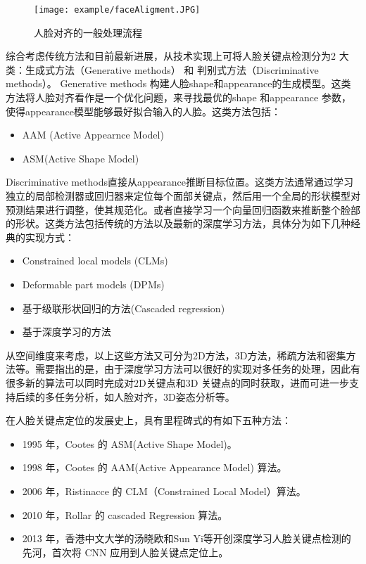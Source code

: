 \begin{figure}[!htp]

\centering
\texttt{[image: example/faceAligment.JPG]}
\caption{人脸对齐的一般处理流程}
\label{figure:3-2}

\end{figure}

综合考虑传统方法和目前最新进展，从技术实现上可将人脸关键点检测分为2 大类：生成式方法（Generative methods） 和 判别式方法（Discriminative methods）。
Generative methods 构建人脸shape和appearance的生成模型。这类方法将人脸对齐看作是一个优化问题，来寻找最优的shape 和appearance 参数，使得appearance模型能够最好拟合输入的人脸。这类方法包括：

\begin{itemize}
    \item AAM (Active Appearnce Model)
    \item ASM(Active Shape Model)
\end{itemize}

Discriminative methods直接从appearance推断目标位置。这类方法通常通过学习独立的局部检测器或回归器来定位每个面部关键点，然后用一个全局的形状模型对预测结果进行调整，使其规范化。或者直接学习一个向量回归函数来推断整个脸部的形状。这类方法包括传统的方法以及最新的深度学习方法，具体分为如下几种经典的实现方式：

\begin{itemize}
    \item Constrained local models (CLMs)
    \item Deformable part models (DPMs)
    \item 基于级联形状回归的方法(Cascaded regression)
    \item 基于深度学习的方法
\end{itemize}

从空间维度来考虑，以上这些方法又可分为2D方法，3D方法，稀疏方法和密集方法等。需要指出的是，由于深度学习方法可以很好的实现对多任务的处理，因此有很多新的算法可以同时完成对2D关键点和3D 关键点的同时获取，进而可进一步支持后续的多任务分析，如人脸对齐，3D姿态分析等。

在人脸关键点定位的发展史上，具有里程碑式的有如下五种方法：
\begin{itemize}
	\item 1995 年，Cootes 的 ASM(Active Shape Model)。
	\item 1998 年，Cootes 的 AAM(Active Appearance Model) 算法。
	\item 2006 年，Ristinacce 的 CLM（Constrained Local Model）算法。
    \item 2010 年，Rollar 的 cascaded Regression 算法。
    \item 2013 年，香港中文大学的汤晓欧和Sun Yi等开创深度学习人脸关键点检测的先河，首次将 CNN 应用到人脸关键点定位上。
\end{itemize}

